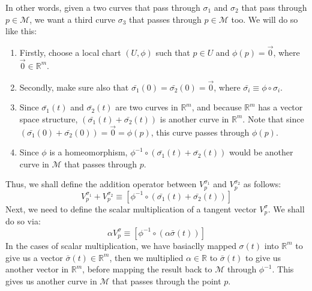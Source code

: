      In other words, given a two curves that pass through $\sigma_1$ and
      $\sigma_2$ that pass through $p \in \mathcal{M}$, we want a third curve
      $\sigma_3$ that passes through $p \in \mathcal{M}$ too. We will do so
      like this:
      \begin{enumerate}
        \item{Firstly, choose a local chart $(U,\phi)$ such that $p\in U$ and
        $\phi(p) = \vec{0}$, where $\vec{0}\in \mathbb{R}^m$.}
        \item{Secondly, make sure also that $\bar{\sigma_1}(0) =
        \bar{\sigma_2}(0) = \vec{0}$, where $\bar{\sigma_i} \equiv \phi \circ
        \sigma_i$.}
        \item{Since $\bar{\sigma_1}(t)$ and $\bar{\sigma_2}(t)$ are two
        curves in $\mathbb{R}^m$, and because $\mathbb{R}^m$ has a vector
        space structure, $\left(\bar{\sigma_1}(t) + \bar{\sigma_2}(t)\right)$
        is another curve in $\mathbb{R}^m$. Note that since
        $\left(\bar{\sigma_1}(0) + \bar{\sigma_2}(0)\right) = \vec{0} =
        \phi(p)$, this curve passes through $\phi(p)$.}
        \item{Since $\phi$ is a homeomorphism, $\phi^{-1}\circ
        \left(\bar{\sigma_1}(t) + \bar{\sigma_2}(t)\right)$ would be another
        curve in $\mathcal{M}$ that passes through $p$.}
      \end{enumerate}
      Thus, we shall define the addition operator between $V^{\sigma_1}_p$
      and $V^{\sigma_2}_p$ as follows:
      \begin{equation}
        \label{eqn: Tangent vector addition}
        V^{\sigma_1}_p + V^{\sigma_2}_p \equiv [\phi^{-1}\circ
        \left(\bar{\sigma_1}(t) + \bar{\sigma_2}(t)\right)]
      \end{equation}
      Next, we need to define the scalar multiplication of a tangent vector
      $V_p^\sigma$. We shall do so via:
      \begin{equation}
        \label{eqn: Tangent vector scalar multiplication}
        \alpha V^{\sigma}_p \equiv [\phi^{-1}\circ
        \left(\alpha\bar{\sigma}(t)\right)]
      \end{equation}
      In the cases of scalar multiplication, we have basiaclly mapped
      $\sigma(t)$ into $\mathbb{R}^m$ to give us a vector $\bar{\sigma}(t) \in
      \mathbb{R}^m$, then we multiplied $\alpha \in \mathbb{R}$ to
      $\bar{\sigma}(t)$ to give us another vector in $\mathbb{R}^m$, before mapping the result back to $\mathcal{M}$ through $\phi^{-1}$. This gives us another curve in $\mathcal{M}$ that passes through the point $p$.

